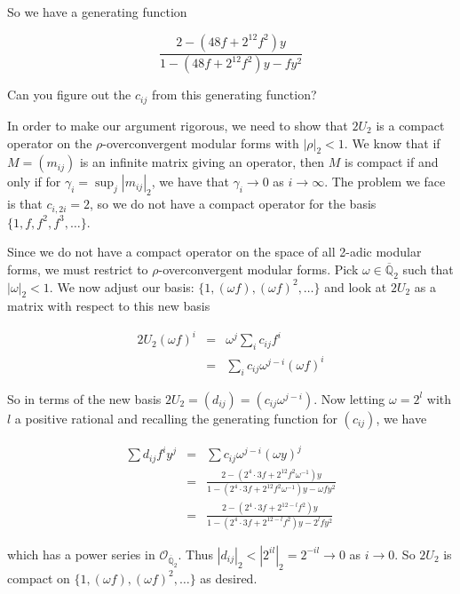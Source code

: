 \documentclass[12pt]{article}
\begin{document}
\noindent So we have a generating function 

\[ \frac{2 - (48f + 2^{12}f^{2})y}{1 - (48f + 2^{12}f^{2})y - fy^{2}} \]

\noindent Can you figure out the $c_{ij}$ from this generating function?

\medskip

In order to make our argument rigorous, we need to show that $2U_{2}$ is a
compact operator on the $\rho$-overconvergent modular forms with $|\rho|_{2}
< 1$.  We know that if $M = (m_{ij})$ is an infinite matrix giving an
operator, then $M$ is compact if and only if for $\gamma_{i} = \sup_{j}
|m_{ij}|_{2}$, we have that $\gamma_{i} \rightarrow 0$ as $i \rightarrow
\infty$.  The problem we face is that $c_{i,2i} = 2$, so we do not have a
compact operator for the basis $\{1, f, f^{2}, f^{3}, \ldots \}$.

\medskip

Since we do not have a compact operator on the space of all 2-adic modular
forms, we must restrict to $\rho$-overconvergent modular forms.  Pick
$\omega \in \mathbb{\overline{Q}}_{2}$ such that $|\omega|_{2} < 1$.  We now
adjust our basis:  $\{1, (\omega f), (\omega f)^{2}, \ldots \}$ and look at
$2U_{2}$ as a matrix with respect to this new basis

\begin{eqnarray*}
2U_{2}(\omega f)^{i} & = & \omega^{j} \sum_{i} c_{ij} f^{i} \\
                     & = & \sum_{i} c_{ij} \omega^{j-i}(\omega f)^{i}
\end{eqnarray*}

\noindent So in terms of the new basis $2U_{2} = (d_{ij}) =
(c_{ij}\omega^{j-i})$.  Now letting $\omega = 2^{l}$ with $l$ a positive
rational and recalling the generating function for $(c_{ij})$, we have

\begin{eqnarray*}
\sum d_{ij}f^{i}y^{j} & = & \sum c_{ij} \omega^{j-i}(\omega y)^{j} \\
                      & = & \frac{2 - (2^{4} \cdot 3f +
2^{12}f^{2}\omega^{-1})y}{1 - (2^{4} \cdot 3f + 2^{12}f^{2}\omega^{-1})y -
\omega fy^{2}} \\
                      & = & \frac{2 - (2^{4} \cdot 3f + 2^{12-l}f^{2})y}{1 -
(2^{4} \cdot 3f + 2^{12-l}f^{2})y -2^{l}fy^{2}}
\end{eqnarray*}

\noindent which has a power series in
$\mathcal{O}_{\mathbb{\overline{Q}}_{2}}$.  Thus $|d_{ij}|_{2} <
|2^{il}|_{2} = 2^{-il} \rightarrow 0$ as $i \rightarrow 0$.  So $2U_{2}$ is
compact on $\{1, (\omega f), (\omega f)^{2}, \ldots \}$ as desired.
\end{document}
